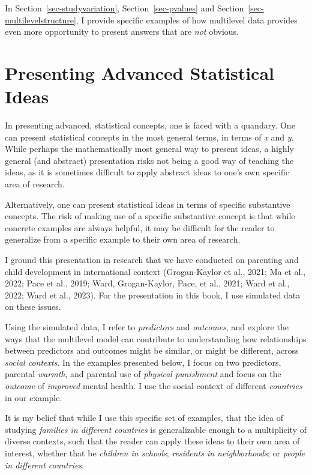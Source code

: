 \documentclass[
  letterpaper,
  DIV=11,
  numbers=noendperiod]{scrreprt}
\begin{document}
In Section~\ref{sec-studyvariation}, Section~\ref{sec-pvalues} and
Section~\ref{sec-multilevelstructure}, I provide specific examples of
how multilevel data provides even more opportunity to present answers
that are \emph{not} obvious.

\section{Presenting Advanced Statistical
Ideas}\label{presenting-advanced-statistical-ideas}

In presenting advanced, statistical concepts, one is faced with a
quandary. One can present statistical concepts in the most general
terms, in terms of \emph{x} and \emph{y}. While perhaps the
mathematically most general way to present ideas, a highly general (and
abstract) presentation risks not being a good way of teaching the ideas,
as it is sometimes difficult to apply abstract ideas to one's own
specific area of research.

Alternatively, one can present statistical ideas in terms of specific
substantive concepts. The risk of making use of a specific substantive
concept is that while concrete examples are always helpful, it may be
difficult for the reader to generalize from a specific example to their
own area of research.

I ground this presentation in research that we have conducted on
parenting and child development in international context (Grogan-Kaylor
et al., 2021; Ma et al., 2022; Pace et al., 2019; Ward, Grogan-Kaylor,
Pace, et al., 2021; Ward et al., 2022; Ward et al., 2023). For the
presentation in this book, I use simulated data on these issues.

Using the simulated data, I refer to \emph{predictors} and
\emph{outcomes}, and explore the ways that the multilevel model can
contribute to understanding how relationships between predictors and
outcomes might be similar, or might be different, across \emph{social
contexts}. In the examples presented below, I focus on two predictors,
parental \emph{warmth}, and parental use of \emph{physical punishment}
and focus on the \emph{outcome} of \emph{improved} mental health. I use
the social context of different \emph{countries} in our example.

It is my belief that while I use this specific set of examples, that the
idea of studying \emph{families in different countries} is generalizable
enough to a multiplicity of diverse contexts, such that the reader can
apply these ideas to their own area of interest, whether that be
\emph{children in schools}; \emph{residents in neighborhoods}; or
\emph{people in different countries}.
\end{document}
